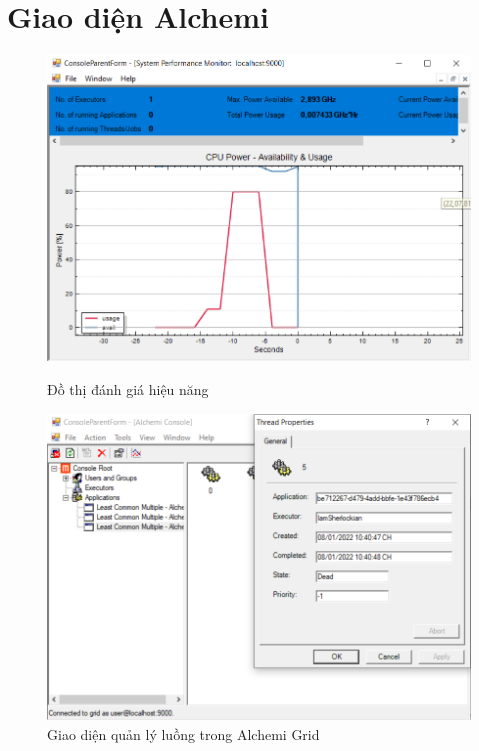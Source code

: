 \documentclass[12pt,a4paper]{report}
\begin{document}
\clearpage
\section{Giao diện Alchemi}
\begin{center}
    \begin{figure}[htp]
    \begin{center}
     	\includegraphics[scale=.56]{./Figures/Problem_02/Graph}
     	\caption{Đồ thị đánh giá hiệu năng}
  
     	\includegraphics[scale=.56]{./Figures/Problem_02/Manage}
    	\caption{Giao diện quản lý luồng trong Alchemi Grid}
    \end{center}
    \end{figure}
\end{center}
\end{document}
